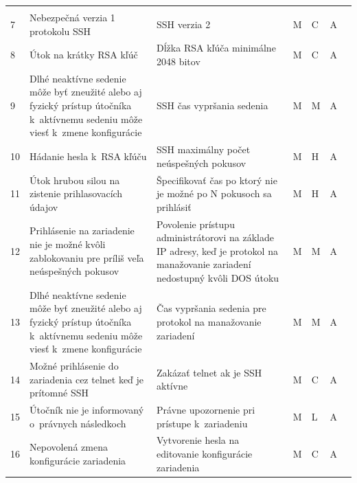 \begin{longtable}[!htbp]{|C{2.5em}L{11em}L{11em}C{2.5em}C{4em}C{5em}L{2.5em}|}
	\cite{Graesser2001}	\\
	 7	&Nebezpečná verzia 1 protokolu SSH	&SSH verzia 2	&M	&C	&A	& \cite{McMillan2018}	\\
	8	&Útok na krátky RSA kľúč	&Dĺžka RSA kľúča minimálne 2048 bitov	&M	&C	&A	& \cite{CIS_DrTLsgXv24lxeIIM}
	
	\cite{Barker2019} 
	\\
	 9	&Dlhé neaktívne sedenie môže byť zneužité alebo aj fyzický prístup útočníka k~aktívnemu sedeniu môže viesť k~zmene konfigurácie	&SSH čas vypršania sedenia	&M	&M	&A	& \cite{CIS_DrTLsgXv24lxeIIM}
	
	\cite{Graesser2001}	\\
	10	&Hádanie hesla k~RSA kľúču	&SSH maximálny počet neúspešných pokusov	&M	&H	&A	& \cite{Hucaby2010}
	
	\cite{Bouska2009}	\\
	 11	&Útok hrubou silou na zistenie prihlasovacích údajov	&Špecifikovať čas po ktorý nie je možné po N pokusoch sa prihlásiť	&M	&H	&A	& \cite{Hucaby2010}
	
	\cite{Bouska2009}	\\
	12	&Prihlásenie na zariadenie nie je možné kvôli zablokovaniu pre príliš veľa neúspešných pokusov	&Povolenie prístupu administrátorovi na základe IP adresy, keď je protokol na manažovanie zariadení nedostupný kvôli DOS útoku	&M	&M	&A	& \cite{Hucaby2010}
	
	\cite{Bouska2009}	\\
	 13	&Dlhé neaktívne sedenie môže byť zneužité alebo aj fyzický prístup útočníka k~aktívnemu sedeniu môže viesť k~zmene konfigurácie	&Čas vypršania sedenia pre protokol na manažovanie zariadení	&M	&M	&A	& \cite{CIS_DrTLsgXv24lxeIIM}
	
	\cite{Graesser2001}
	
	\cite{uYLsMtQInofenpV3}
	\\
	14	&Možné prihlásenie do zariadenia cez telnet keď je prítomné SSH	&Zakázať telnet ak je SSH aktívne	&M	&C	&A	& \cite{CIS_DrTLsgXv24lxeIIM}
	
	\cite{Graesser2001}	\\
	 15	&Útočník nie je informovaný o~právnych následkoch	&Právne upozornenie pri prístupe k~zariadeniu	&M	&L	&A	& \cite{McMillan2018}
	
	\cite{CIS_DrTLsgXv24lxeIIM}
	
	\cite{Graesser2001}	\\
	16	&Nepovolená zmena konfigurácie zariadenia	&Vytvorenie hesla na editovanie konfigurácie zariadenia	&M	&C	&A	& \cite{CIS_DrTLsgXv24lxeIIM}
	

\end{longtable}
